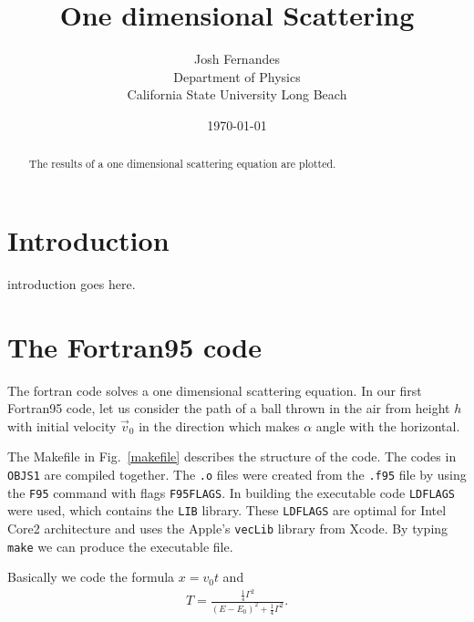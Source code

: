 \documentclass[12pt]{article}
\begin{document}




\title{One dimensional Scattering}
\author{Josh Fernandes \\
Department of Physics\\
California State University Long Beach}
\date{\today }

  
\maketitle



\begin{abstract}
The results of a one dimensional scattering equation are plotted.
\end{abstract}

\section{Introduction}

introduction goes here.



\section{The Fortran95 code}

The fortran code solves a one dimensional scattering equation. In our first Fortran95 code, let us consider the path of a ball thrown in the air from height $h$ with initial velocity $\vec{v}_{0}$ in the direction which makes $\alpha$ angle with the horizontal.

The Makefile in Fig.\ \ref{makefile} describes the structure of the code. The codes in {\tt OBJS1} are 
compiled together. The {\tt .o} files were created from the {\tt .f95} file by using the {\tt F95} command
with flags {\tt F95FLAGS}. In building the executable code {\tt LDFLAGS} were used, which contains 
the {\tt LIB} library. These {\tt LDFLAGS} are optimal for Intel Core2 architecture and uses the 
Apple's {\tt vecLib} library from Xcode. By typing {\tt make} we can produce the executable file.

Basically we code the formula $x=v_{0} t$ and
\begin{gather}
T = \frac{\frac{1}{4}\Gamma^2}{(E-E_0)^2 + \frac{1}{4}\Gamma^2}.
\end{gather}
\end{document}

